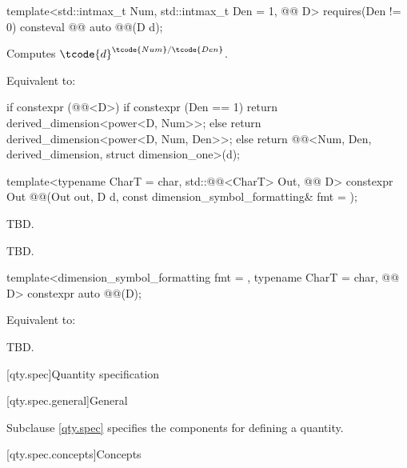 \begin{itemdecl}
template<std::intmax_t Num, std::intmax_t Den = 1, @@ D>
  requires(Den != 0)
consteval @@ auto @@(D d);
\end{itemdecl}

\begin{itemdescr}
\pnum
Computes $\tcode{d}^{\tcode{Num}/\tcode{Den}}$.

\pnum
\effects
Equivalent to:
\begin{codeblock}
if constexpr (@@<D>) {
  if constexpr (Den == 1)
    return derived_dimension<power<D, Num>>{};
  else
    return derived_dimension<power<D, Num, Den>>{};
} else
  return @@<Num, Den, derived_dimension, struct dimension_one>(d);
\end{codeblock}
\end{itemdescr}

\begin{itemdecl}
template<typename CharT = char, std::@@<CharT> Out, @@ D>
constexpr Out @@(Out out, D d, const dimension_symbol_formatting& fmt = {});
\end{itemdecl}

\begin{itemdescr}
\pnum
\effects
TBD.

\pnum
\returns
TBD.
\end{itemdescr}

\begin{itemdecl}
template<dimension_symbol_formatting fmt = {}, typename CharT = char, @@ D>
constexpr auto @@(D);
\end{itemdecl}

\begin{itemdescr}
\pnum
\effects
Equivalent to:
\begin{codeblock}
TBD.
\end{codeblock}
\end{itemdescr}

[qty.spec]{Quantity specification}

[qty.spec.general]{General}

\pnum
Subclause \ref{qty.spec} specifies the components
for defining a quantity.

[qty.spec.concepts]{Concepts}

